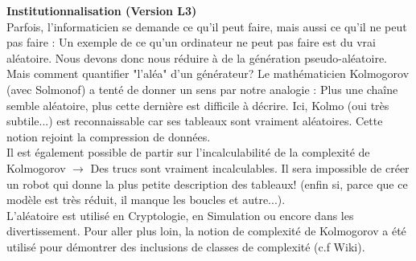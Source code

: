 \documentclass[10pt]{article}
\begin{document}
\textbf{Institutionnalisation (Version L3)}\\
    Parfois, l'informaticien se demande ce qu'il peut faire, mais aussi ce qu'il ne peut pas faire : Un exemple de ce qu'un ordinateur ne peut pas faire est du vrai aléatoire. Nous devons donc nous réduire à de la génération pseudo-aléatoire. Mais comment quantifier "l'aléa" d'un générateur? Le mathématicien Kolmogorov (avec Solmonof) a tenté de donner un sens par notre analogie : Plus une chaîne semble aléatoire, plus cette dernière est difficile à décrire. Ici, Kolmo (oui très subtile...) est reconnaissable car ses tableaux sont vraiment aléatoires. Cette notion rejoint la compression de données.\\
Il est également possible de partir sur l'incalculabilité de la complexité de Kolmogorov $\to$ Des trucs sont vraiment incalculables. Il sera impossible de créer un robot qui donne la plus petite description des tableaux! (enfin si, parce que ce modèle est très réduit, il manque les boucles et autre...).\\
L'aléatoire est utilisé en Cryptologie, en Simulation ou encore dans les divertissement. Pour aller plus loin, la notion de complexité de Kolmogorov a été utilisé pour démontrer des inclusions de classes de complexité (c.f Wiki).
\end{document}
